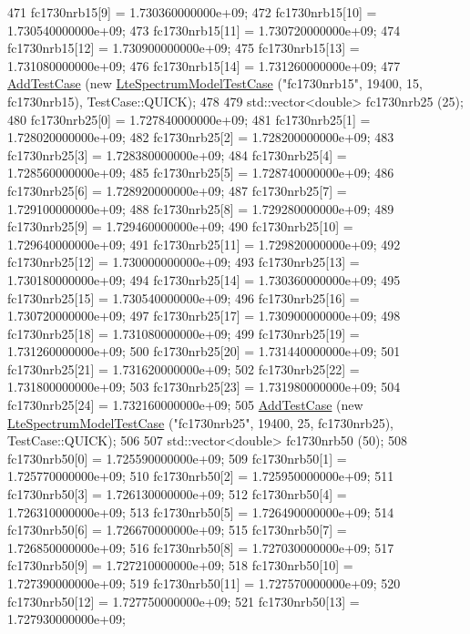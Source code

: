 \begin{DoxyCode}
471   fc1730nrb15[9] = 1.730360000000e+09;
472   fc1730nrb15[10] = 1.730540000000e+09;
473   fc1730nrb15[11] = 1.730720000000e+09;
474   fc1730nrb15[12] = 1.730900000000e+09;
475   fc1730nrb15[13] = 1.731080000000e+09;
476   fc1730nrb15[14] = 1.731260000000e+09;
477   \hyperlink{classns3_1_1TestCase_a3718088e3eefd5d6454569d2e0ddd835}{AddTestCase} (\textcolor{keyword}{new} \hyperlink{classLteSpectrumModelTestCase}{LteSpectrumModelTestCase} (\textcolor{stringliteral}{"fc1730nrb15"}, 19400, 15, 
      fc1730nrb15), TestCase::QUICK);
478 
479   std::vector<double> fc1730nrb25 (25);
480   fc1730nrb25[0] = 1.727840000000e+09;
481   fc1730nrb25[1] = 1.728020000000e+09;
482   fc1730nrb25[2] = 1.728200000000e+09;
483   fc1730nrb25[3] = 1.728380000000e+09;
484   fc1730nrb25[4] = 1.728560000000e+09;
485   fc1730nrb25[5] = 1.728740000000e+09;
486   fc1730nrb25[6] = 1.728920000000e+09;
487   fc1730nrb25[7] = 1.729100000000e+09;
488   fc1730nrb25[8] = 1.729280000000e+09;
489   fc1730nrb25[9] = 1.729460000000e+09;
490   fc1730nrb25[10] = 1.729640000000e+09;
491   fc1730nrb25[11] = 1.729820000000e+09;
492   fc1730nrb25[12] = 1.730000000000e+09;
493   fc1730nrb25[13] = 1.730180000000e+09;
494   fc1730nrb25[14] = 1.730360000000e+09;
495   fc1730nrb25[15] = 1.730540000000e+09;
496   fc1730nrb25[16] = 1.730720000000e+09;
497   fc1730nrb25[17] = 1.730900000000e+09;
498   fc1730nrb25[18] = 1.731080000000e+09;
499   fc1730nrb25[19] = 1.731260000000e+09;
500   fc1730nrb25[20] = 1.731440000000e+09;
501   fc1730nrb25[21] = 1.731620000000e+09;
502   fc1730nrb25[22] = 1.731800000000e+09;
503   fc1730nrb25[23] = 1.731980000000e+09;
504   fc1730nrb25[24] = 1.732160000000e+09;
505   \hyperlink{classns3_1_1TestCase_a3718088e3eefd5d6454569d2e0ddd835}{AddTestCase} (\textcolor{keyword}{new} \hyperlink{classLteSpectrumModelTestCase}{LteSpectrumModelTestCase} (\textcolor{stringliteral}{"fc1730nrb25"}, 19400, 25, 
      fc1730nrb25), TestCase::QUICK);
506 
507   std::vector<double> fc1730nrb50 (50);
508   fc1730nrb50[0] = 1.725590000000e+09;
509   fc1730nrb50[1] = 1.725770000000e+09;
510   fc1730nrb50[2] = 1.725950000000e+09;
511   fc1730nrb50[3] = 1.726130000000e+09;
512   fc1730nrb50[4] = 1.726310000000e+09;
513   fc1730nrb50[5] = 1.726490000000e+09;
514   fc1730nrb50[6] = 1.726670000000e+09;
515   fc1730nrb50[7] = 1.726850000000e+09;
516   fc1730nrb50[8] = 1.727030000000e+09;
517   fc1730nrb50[9] = 1.727210000000e+09;
518   fc1730nrb50[10] = 1.727390000000e+09;
519   fc1730nrb50[11] = 1.727570000000e+09;
520   fc1730nrb50[12] = 1.727750000000e+09;
521   fc1730nrb50[13] = 1.727930000000e+09;

\end{DoxyCode}
